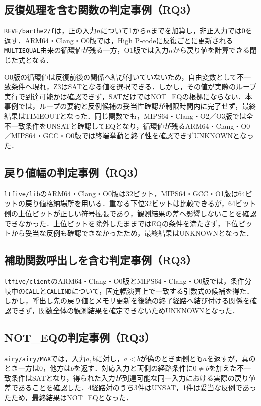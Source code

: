 \subsection{反復処理を含む関数の判定事例（RQ3）}\label{sec:iter-case}
\texttt{REVE/barthe2/f}は，正の入力$n$について1から$n$までを加算し，非正入力では0を返す．ARM64・Clang・O0版では，High P-codeに反復ごとに更新される\texttt{MULTIEQUAL}由来の循環値が残る一方，O1版では入力$n$から戻り値を計算できる閉じた式となる．

O0版の循環値は反復前後の関係へ結び付いていないため，自由変数として不一致条件へ現れ，Z3はSATとなる値を選択できる．しかし，その値が実際のループ実行で到達可能かは確認できず，SATだけではNOT\_EQの根拠にならない．本事例では，ループの要約と反例候補の妥当性確認が制限時間内に完了せず，最終結果はTIMEOUTとなった．同じ関数でも，MIPS64・Clang・O2／O3版では全不一致条件をUNSATと確認してEQとなり，循環値が残るARM64・Clang・O0／MIPS64・GCC・O0版では終端挙動と終了性を確認できずUNKNOWNとなった．

\subsection{戻り値幅の判定事例（RQ3）}\label{sec:width-case}
\texttt{ltfive/lib}のARM64・Clang・O0版は32ビット，MIPS64・GCC・O1版は64ビットの戻り値格納場所を用いる．重なる下位32ビットは比較できるが，64ビット側の上位ビットが正しい符号拡張であり，観測結果の差へ影響しないことを確認できなかった．上位ビットを除外したままではEQの条件を満たさず，下位ビットから妥当な反例も確認できなかったため，最終結果はUNKNOWNとなった．

\subsection{補助関数呼出しを含む判定事例（RQ3）}
\texttt{ltfive/client}のARM64・Clang・O0版とMIPS64・Clang・O0版では，条件分岐中の\texttt{CALL}と\texttt{CALLIND}について，固定幅演算上で一致する引数式の候補を得た．しかし，呼出し先の戻り値とメモリ更新を後続の終了経路へ結び付ける関係を確認できず，関数全体の観測結果を確定できないためUNKNOWNとなった．

\subsection{NOT\_EQの判定事例（RQ3）}
\texttt{airy/airy/MAX}では，入力$a,b$に対し，$a<b$が偽のとき両側とも$a$を返すが，真のとき一方は0，他方は$b$を返す．対応入力と両側の経路条件に$0\neq b$を加えた不一致条件はSATとなり，得られた入力が到達可能な同一入力における実際の戻り値差であることを確認した．4経路対のうち3件はUNSAT，1件は妥当な反例であったため，最終結果はNOT\_EQとなった．

